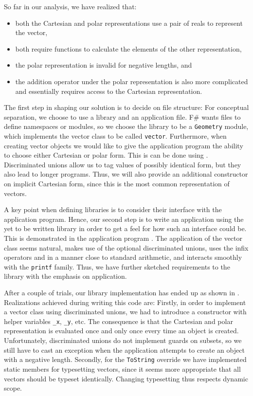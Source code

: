 \documentclass[fsharpNotes.tex]{subfiles}
\begin{document}
So far in our analysis, we have realized that:
\begin{itemize}
\item both the Cartesian and polar representations use a pair of reals to represent the vector, 
\item both require functions to calculate the elements of the other representation, 
\item the polar representation is invalid for negative lengths, and
\item the addition operator under the polar representation is also more complicated and essentially requires access to the Cartesian representation.
\end{itemize}
 

The first step in shaping our solution is to decide on file structure: For conceptual separation, we choose to use a library and an application file. F\# wants files to define namespaces or modules, so we choose the library to be a \lstinline{Geometry} module, which implements the vector class to be called \lstinline{vector}. Furthermore, when creating vector objects we would like to give the application program the ability to choose either Cartesian or polar form. This is can be done using . Discriminated unions allow us to tag values of possibly identical form, but they also lead to longer programs. Thus, we will also provide an additional constructor on implicit Cartesian form, since this is the most common representation of vectors.

A key point when defining libraries is to consider their interface with the application program. Hence, our second step is to write an application using the yet to be written library in order to get a feel for how such an interface could be. This is demonstrated in the application program .
%
%
The application of the vector class seems natural, makes use of the optional discriminated unions, uses the infix operators \lexeme{+} and \lexeme{*} in a manner close to standard arithmetic, and interacts smoothly with the \lstinline{printf} family. Thus, we have further sketched requirements to the library with the emphasis on application.

After a couple of trials, our library implementation has ended up as shown in .
%
%
Realizations achieved during writing this code are: Firstly, in order to implement a vector class using discriminated unions, we had to introduce a constructor with helper variables \lstinline{_x}, \lstinline{_y}, etc. The consequence is that the Cartesian and polar representation is evaluated once and only once every time an object is created. Unfortunately, discriminated unions do not implement guards on subsets, so we still have to cast an exception when the application attempts to create an object with a negative length. Secondly, for the \lstinline{ToString} override we have implemented static members for typesetting vectors, since it seems more appropriate that all vectors should be typeset identically. Changing typesetting thus respects dynamic scope.
\end{document}
